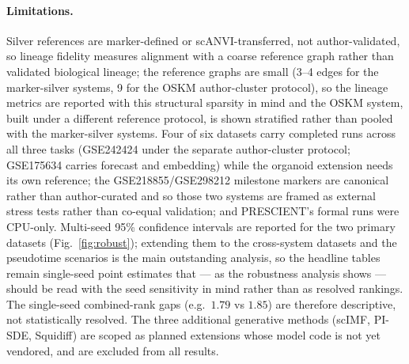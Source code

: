 \documentclass[11pt]{article}
\begin{document}
\paragraph{Limitations.} Silver references are marker-defined or scANVI-transferred,
not author-validated, so lineage fidelity measures alignment with a coarse reference
graph rather than validated biological lineage; the reference graphs are small (3--4 edges for
the marker-silver systems, 9 for the OSKM author-cluster protocol), so the lineage
metrics are reported with this structural sparsity in mind and the OSKM system, built
under a different reference protocol, is shown stratified rather than pooled with the
marker-silver systems. Four of six datasets carry completed runs across all three tasks
(GSE242424 under the separate author-cluster protocol; GSE175634 carries forecast and
embedding) while the organoid extension needs its own reference; the GSE218855/GSE298212
milestone markers are canonical rather than author-curated and so those two systems are
framed as external stress tests rather than co-equal validation; and PRESCIENT's formal
runs were CPU-only. Multi-seed 95\% confidence intervals are reported for the two primary
datasets (Fig.~\ref{fig:robust}); extending them to the cross-system datasets and the
pseudotime scenarios is the main outstanding analysis, so the headline tables remain
single-seed point estimates that --- as the robustness analysis shows --- should be read
with the seed sensitivity in mind rather than as resolved rankings. The single-seed
combined-rank gaps (e.g.\ $1.79$ vs $1.85$) are therefore descriptive, not statistically
resolved. The three additional generative methods (scIMF, PI-SDE, Squidiff) are scoped as
planned extensions whose model code is not yet vendored, and are excluded from all results.

\end{document}
